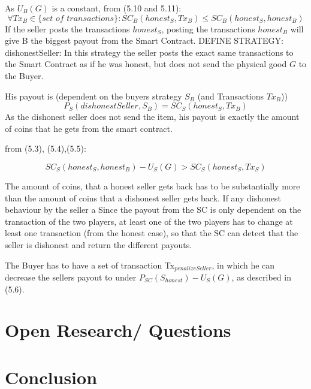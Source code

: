 \documentclass{cacthesis}
\begin{document}
As $U_B(G)$ is a constant, from (5.10 and 5.11):
\begin{equation}
    \forall Tx_B \in \{\textit{set of transactions}\}: SC_B(honest_S, Tx_B) \leq SC_B(honest_S,honest_B)
\end{equation}
If the seller posts the transactions $honest_S$, posting the transactions $honest_B$ will give B the biggest payout from the Smart Contract.
DEFINE STRATEGY:
dishonestSeller: In this strategy the seller posts the exact same transactions to the Smart Contract as if he was honest, but does not send the physical good $G$ to the Buyer.\newline

His payout is (dependent on the buyers strategy $S_B$ (and Transactions $Tx_B$))
\begin{equation}
    P_S(dishonestSeller,S_B) = SC_S(honest_S,Tx_B)
\end{equation}
As the dishonest seller does not send the item, his payout is exactly the amount of coins that he gets from the smart contract.

from (5.3), (5.4),(5.5):

\begin{equation}
   SC_S(honest_S,honest_B)- U_S(G) > SC_S(honest_S,Tx_S)
\end{equation}

The amount of coins, that a honest seller gets back has to be substantially more than the amount of coins that a dishonest seller gets back.\newline
If any dishonest behaviour by the seller a
Since the payout from the SC is only dependent on the transaction of the two players, at least one of the two players has to change at least one transaction (from the honest case), so that the SC can detect that the seller is dishonest and return the different payouts.\newline

The Buyer has to have a set of transaction Tx$_{penalizeSeller}$, in which he can decrease the sellers payout to under $P_{SC}(S_{honest})- U_S(G)$, as described in (5.6).\newline

\chapter{Open Research/ Questions}

\chapter{Conclusion}
	
	
	
	\appendix
\end{document}

